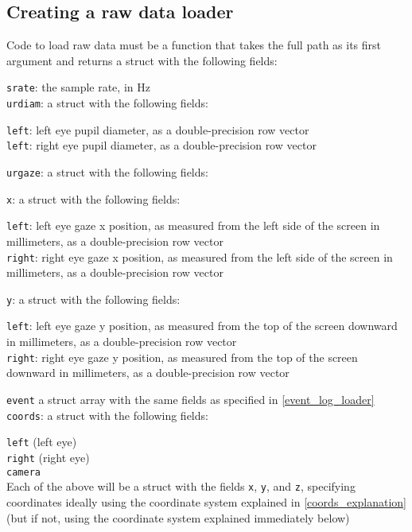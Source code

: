 \documentclass{article}
\begin{document}
\subsection{Creating a raw data loader}
Code to load raw data must be a function that takes the full path as its first argument and returns a struct with the following fields:
\begin{addmargin}[1em]{0em}
\texttt{srate}: the sample rate, in Hz\\
\texttt{urdiam}: a struct with the following fields:
\begin{addmargin}[1em]{0em}
\texttt{left}: left eye pupil diameter, as a double-precision row vector\\
\texttt{left}: right eye pupil diameter, as a double-precision row vector
\end{addmargin}
\texttt{urgaze}: a struct with the following fields:
\begin{addmargin}[1em]{0em}
\texttt{x}: a struct with the following fields:
\begin{addmargin}[1em]{0em}
\texttt{left}: left eye gaze x position, as measured from the left side of the screen in millimeters, as a double-precision row vector\\
\texttt{right}: right eye gaze x position, as measured from the left side of the screen in millimeters, as a double-precision row vector
\end{addmargin}
\texttt{y}: a struct with the following fields:
\begin{addmargin}[1em]{0em}
\texttt{left}: left eye gaze y position, as measured from the top of the screen downward in millimeters, as a double-precision row vector\\
\texttt{right}: right eye gaze y position, as measured from the top of the screen downward in millimeters, as a double-precision row vector
\end{addmargin}
\end{addmargin}
\indent\texttt{event} a struct array with the same fields as specified in \ref{event_log_loader}\\
\texttt{coords}: a struct with the following fields:
\begin{addmargin}[1em]{0em}
\texttt{left} (left eye)\\
\texttt{right} (right eye)\\
\texttt{camera}\\
Each of the above will be a struct with the fields \texttt{x}, \texttt{y}, and \texttt{z}, specifying coordinates ideally using the coordinate system explained in \ref{coords_explanation} (but if not, using the coordinate system explained immediately below)

\end{addmargin}
\end{addmargin}
\end{document}
